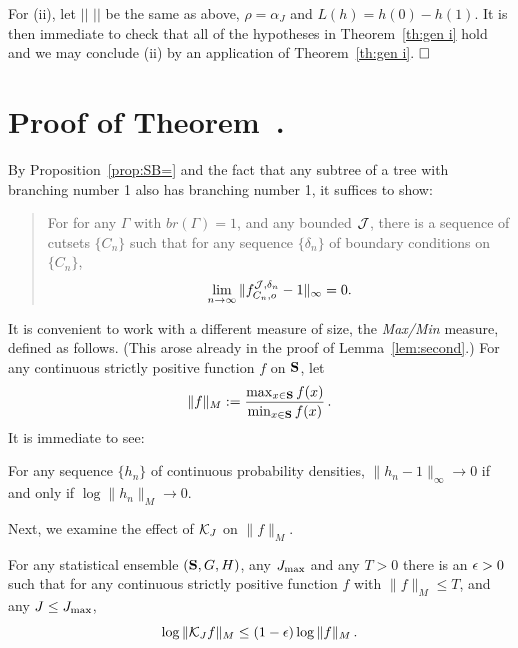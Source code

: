 For (ii), let $||\,\,||$ be the same as above, $\rho=\alpha_J$ and
$L(h)=h(0)-h(1)$. It is then immediate to check that 
all of the hypotheses in Theorem~\ref{th:gen i} hold and we may conclude
(ii) by an application of Theorem~\ref{th:gen i}. $\qed$  

\setcounter{equation}{0}

\section{Proof of Theorem~\protect{\ref{th:0hd}}.} \label{sec:zero}

By Proposition~\ref{prop:SB=} and the fact that any subtree of
a tree with branching number 1 also has branching number 1, 
it suffices to show:
\begin{quote}
For for any $\Gamma$ with $\textstyle {br} (\Gamma) = 1$, 
and any bounded $\J$, there is
a sequence of cutsets $\{ C_n \}$ such that for any sequence 
$\{ \delta_n \}$ of boundary conditions on $\{ C_n \}$, 
$$
\lim_{n\to\infty}\| f^{\J , \delta_n}_{C_n , o} - 1\|_\infty = 0 .
$$
\end{quote}

It is convenient to work with a different measure of size, the {\em Max/Min} 
measure, defined as follows. (This arose already in the proof of
Lemma~\ref{lem:second}.) For any continuous strictly positive 
function $f$ on $\S$, let
$$\|f\|_M := {\max_{x \in \S} f(x) \over \min_{x \in \S} f(x)} \, .$$
It is immediate to see:

\begin{lem} \label{lem:mmequiv}
For any sequence $\{ h_n \}$ of continuous
probability densities, $\|h_n - 1\|_\infty \rightarrow 0$ if and only if 
$\log \|h_n\|_M \rightarrow 0$.
\end{lem}

Next, we examine the effect of $\KJ$ on $\|f\|_M$.  
%
\begin{lem} \label{lem:unifmm}
For any statistical ensemble $(\S , G , H)$,
any $J_{\rm max}$ and any $T > 0$ there 
is an $\eps > 0$ such that for any continuous strictly 
positive function $f$ with 
$\|f\|_M \leq T$, and any $J \leq J_{\rm max}$, 
$$\log \|\KJ f\|_M \leq (1 - \eps) \log \| f \|_M \, .$$
\end{lem}

